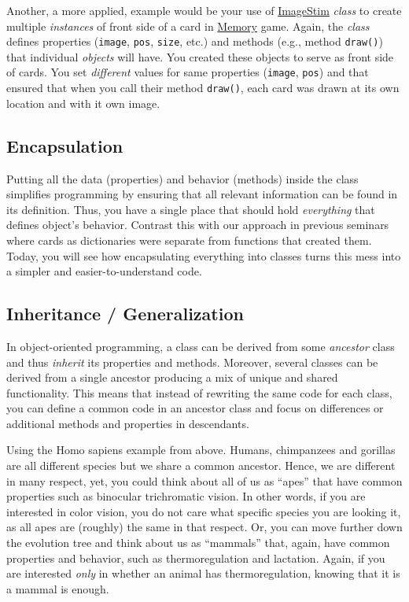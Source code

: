 \documentclass[
]{book}
\begin{document}
Another, a more applied, example would be your use of \href{https://psychopy.org/api/visual/imagestim.html\#psychopy.visual.ImageStim}{ImageStim} \emph{class} to create multiple \emph{instances} of front side of a card in \href{memory-game}{Memory} game. Again, the \emph{class} defines properties (\texttt{image}, \texttt{pos}, \texttt{size}, etc.) and methods (e.g., method \texttt{draw()}) that individual \emph{objects} will have. You created these objects to serve as front side of cards. You set \emph{different} values for same properties (\texttt{image}, \texttt{pos}) and that ensured that when you call their method \texttt{draw()}, each card was drawn at its own location and with it own image.

\hypertarget{encapsulation}{%
\subsection{Encapsulation}\label{encapsulation}}

Putting all the data (properties) and behavior (methods) inside the class simplifies programming by ensuring that all relevant information can be found in its definition. Thus, you have a single place that should hold \emph{everything} that defines object's behavior. Contrast this with our approach in previous seminars where cards as dictionaries were separate from functions that created them. Today, you will see how encapsulating everything into classes turns this mess into a simpler and easier-to-understand code.

\hypertarget{inheritance-generalization}{%
\subsection{Inheritance / Generalization}\label{inheritance-generalization}}

In object-oriented programming, a class can be derived from some \emph{ancestor} class and thus \emph{inherit} its properties and methods. Moreover, several classes can be derived from a single ancestor producing a mix of unique and shared functionality. This means that instead of rewriting the same code for each class, you can define a common code in an ancestor class and focus on differences or additional methods and properties in descendants.

Using the Homo sapiens example from above. Humans, chimpanzees and gorillas are all different species but we share a common ancestor. Hence, we are different in many respect, yet, you could think about all of us as ``apes'' that have common properties such as binocular trichromatic vision. In other words, if you are interested in color vision, you do not care what specific species you are looking it, as all apes are (roughly) the same in that respect. Or, you can move further down the evolution tree and think about us as ``mammals'' that, again, have common properties and behavior, such as thermoregulation and lactation. Again, if you are interested \emph{only} in whether an animal has thermoregulation, knowing that it is a mammal is enough.
\end{document}
